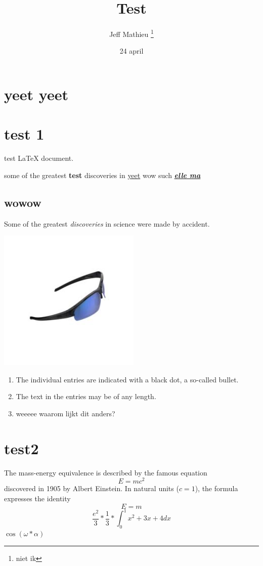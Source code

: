 \documentclass[12pt, letterpaper]{article}
\title{Test}
\author{Jeff Mathieu \thanks{niet ik}}
\date{24 april}
\begin{document}
\maketitle
\tableofcontents

\section*{yeet yeet}

\section{test 1}

test \LaTeX{} document.\newline
    

some of the greatest \textbf{test}
discoveries in \underline{yeet}
wow such \textbf{\textit{\underline{elle ma}}}\newline
\subsection{wowow}
Some of the greatest \emph{discoveries} 
in science 
were made by accident.


\includegraphics{universe.jpeg}


\begin{enumerate}
    \item The individual entries are indicated with a black dot, a so-called bullet.
    \item The text in the entries may be of any length.
    \item weeeee waarom lijkt dit anders?
\end{enumerate}


\section{test2}
The mass-energy equivalence is described by the famous equation
\[ E=mc^2 \]
discovered in 1905 by Albert Einstein. 
In natural units ($c = 1$), the formula expresses the identity
\begin{equation}
E=m
\end{equation}
\[\frac{e^2}{3} * \frac{1}{3} * \int_0^1 x^2 + 3x + 4dx\]
$\cos(\omega * \alpha)$\newline
\end{document}
